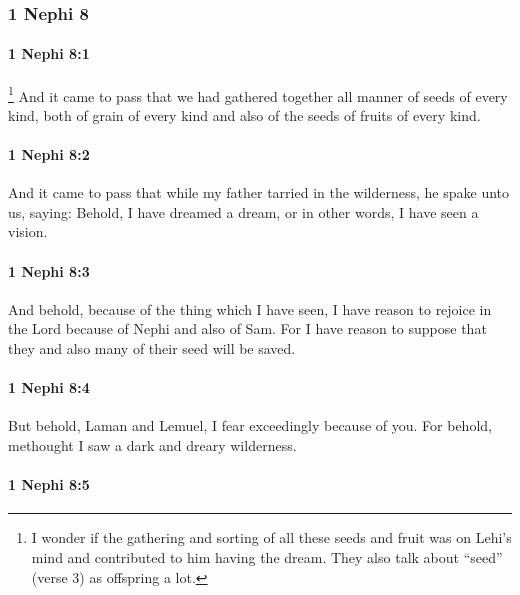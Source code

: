 	\subsubsection{1 Nephi 8} %
		\label{1NEPHI-8}
		
		\paragraph{1 Nephi 8:1} %
			\label{1NEPHI-8-1}

			\footnote{%
				I wonder if the gathering and sorting of all these seeds and fruit was on Lehi's mind and contributed to him having the dream. They also talk about ``seed'' (verse 3) as offspring a lot.
				}%
			And it came to pass that we had gathered together
			all manner of seeds of every kind,
			both of grain of every kind and also of the seeds of fruits of every kind.

		\paragraph{1 Nephi 8:2} %
			\label{1NEPHI-8-2}

			And it came to pass that while my father tarried in the wilderness,
			he spake unto us, saying:
			Behold, I have dreamed a dream,
			or in other words, I have seen a vision.

		\paragraph{1 Nephi 8:3} %
			\label{1NEPHI-8-3}

			And behold, because of the thing which I have seen,
			I have reason to rejoice in the Lord because of Nephi and also of Sam.
			For I have reason to suppose
			that they and also many of their seed will be saved.

		\paragraph{1 Nephi 8:4} %
			\label{1NEPHI-8-4}

			But behold, Laman and Lemuel, I fear exceedingly because of you.
			For behold, methought I saw a dark and dreary wilderness.

		\paragraph{1 Nephi 8:5} %
			\label{1NEPHI-8-5}

